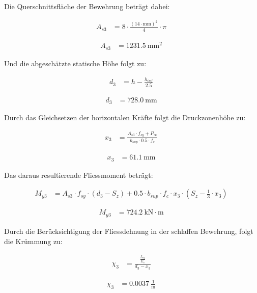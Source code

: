 \documentclass[
  11pt,
  letterpaper,
]{scrreprt}
\begin{document}
Die Querschnittsfläche der Bewehrung beträgt dabei:

$$
\begin{aligned}
A_{s3} &= 8 \cdot \frac{ \left( 14 \cdot \mathrm{mm} \right) ^{ 2 } }{ 4 } \cdot \pi \; 
\end{aligned}
$$

$$
\begin{aligned}
A_{s3} &= 1231.5\ \mathrm{mm}^{2} \;
\end{aligned}
$$

Und die abgeschätzte statische Höhe folgt zu:

$$
\begin{aligned}
d_{3} &= h - \frac{ h_{inf} }{ 2.5 } \; 
\end{aligned}
$$

$$
\begin{aligned}
d_{3} &= 728.0\ \mathrm{mm} \;
\end{aligned}
$$

Durch das Gleichsetzen der horizontalen Kräfte folgt die Druckzonenhöhe
zu:

$$
\begin{aligned}
x_{3} &= \frac{ A_{s3} \cdot f_{sy} + P_{\infty} }{ b_{sup} \cdot 0.5 \cdot f_{c} } \; 
\end{aligned}
$$

$$
\begin{aligned}
x_{3} &= 61.1\ \mathrm{mm} \;
\end{aligned}
$$

Das daraus resultierende Fliessmoment beträgt:

$$
\begin{aligned}
M_{y3} &= A_{s3} \cdot f_{sy} \cdot \left( d_{3} - S_{z} \right) + 0.5 \cdot b_{sup} \cdot f_{c} \cdot x_{3} \cdot \left( S_{z} - \frac{ 1 }{ 3 } \cdot x_{3} \right) \; 
\end{aligned}
$$

$$
\begin{aligned}
M_{y3} &= 724.2\ \mathrm{kN} \cdot \mathrm{m} \;
\end{aligned}
$$

Durch die Berücksichtigung der Fliessdehnung in der schlaffen Bewehrung,
folgt die Krümmung zu:

$$
\begin{aligned}
\chi_{3} &= \frac{ \frac{ f_{sy} }{ E_{s} } }{ d_{3} - x_{3} } \; 
\end{aligned}
$$

$$
\begin{aligned}
\chi_{3} &= 0.0037\ \frac{1}{\mathrm{m}} \;
\end{aligned}
$$
\end{document}
